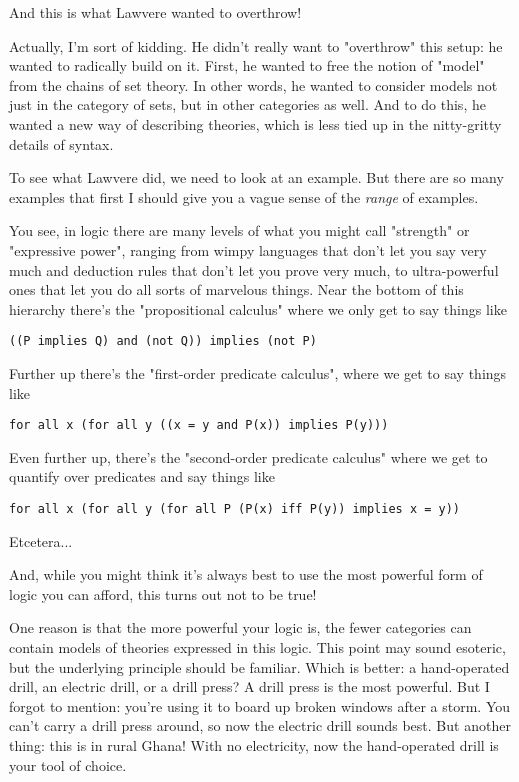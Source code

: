 And this is what Lawvere wanted to overthrow!  

Actually, I'm sort of kidding.  He didn't really want to
"overthrow" this setup: he wanted to radically build on it.
First, he wanted to free the notion of "model" from the
chains of set theory.  In other words, he wanted to consider models
not just in the category of sets, but in other categories as well.
And to do this, he wanted a new way of describing theories, which is
less tied up in the nitty-gritty details of syntax.

To see what Lawvere did, we need to look at an example.  But there
are so many examples that first I should give you a vague sense of the
\emph{range} of examples.  

You see, in logic there are many levels of what you might call
"strength" or "expressive power", ranging from
wimpy languages that don't let you say very much and deduction rules
that don't let you prove very much, to ultra-powerful ones that let
you do all sorts of marvelous things.  Near the bottom of this
hierarchy there's the "propositional calculus" where we only
get to say things like

\begin{verbatim}
((P implies Q) and (not Q)) implies (not P)
\end{verbatim}
    
Further up there's the "first-order predicate calculus",
where we get to say things like

\begin{verbatim}
for all x (for all y ((x = y and P(x)) implies P(y)))
\end{verbatim}
    
Even further up, there's the "second-order predicate calculus" where 
we get to quantify over predicates and say things like

\begin{verbatim}
for all x (for all y (for all P (P(x) iff P(y)) implies x = y))
\end{verbatim}
    
Etcetera...  

And, while you might think it's always best to use the most powerful 
form of logic you can afford, this turns out not to be true!

One reason is that the more powerful your logic is, the fewer categories
can contain models of theories expressed in this logic.  This point may
sound esoteric, but the underlying principle should be familiar.  Which
is better: a hand-operated drill, an electric drill, or a drill press?  
A drill press is the most powerful.  But I forgot to mention: you're 
using it to board up broken windows after a storm.  You can't carry a
drill press around, so now the electric drill sounds best.  But another
thing: this is in rural Ghana!  With no electricity, now the hand-operated 
drill is your tool of choice.


